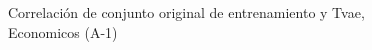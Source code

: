\begin{figure}[H]
    \centering
    
    \caption{Correlación de conjunto original de entrenamiento y Tvae, Economicos (A-1)}
    \label{pairwise-economicos-a-1-tvae}
\end{figure}